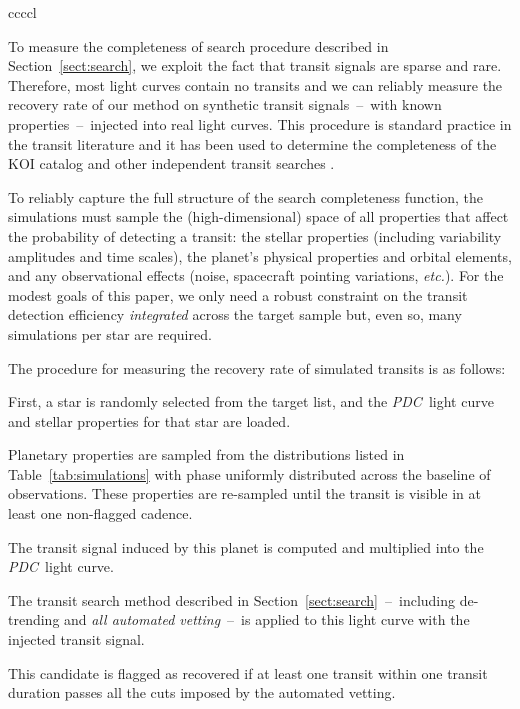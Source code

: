 \documentclass[manuscript, letterpaper]{aastex6}
\makeatletter
\let\origsection\section
\renewcommand\section{\@ifstar{\starsection}{\nostarsection}}
\newcommand\nostarsection[1]{\sectionprelude\origsection{#1}}
\newcommand\starsection[1]{\sectionprelude\origsection*{#1}}
\newcommand\sectionprelude{\vspace{1em}}
\newcommand{\project}[1]{\textsl{#1}}
\newcommand{\pdc}{\project{PDC}}
\newcommand{\foreign}[1]{\emph{#1}}
\newcommand{\etc}{\foreign{etc.}}
\newcommand{\sectionname}{Section}
\newcommand{\sectref}[1]{\ref{sect:#1}}
\newcommand{\Sect}[1]{\sectionname~\sectref{#1}}
\newcommand{\sect}[1]{\Sect{#1}}
\newcommand{\sectlabel}[1]{\label{sect:#1}}
\makeatother
\begin{document}
\begin{floattable}
\begin{deluxetable}{ccccl}
\tabletypesize{\footnotesize}
\caption{The signals rejected with a centroid shift or large impact parameter
\label{tab:rejects}}

\end{deluxetable}
\end{floattable}


\section{Empirical search completeness}\sectlabel{completeness}

To measure the completeness of search procedure described in \sect{search}, we
exploit the fact that transit signals are sparse and rare.
Therefore, most light curves contain no transits and we can reliably measure
the recovery rate of our method on synthetic transit signals~--~with known
properties~--~injected into real light curves.
This procedure is standard practice in the transit literature and it has been
used to determine the completeness of the KOI catalog
\citep{Christiansen:2013, Christiansen:2015} and other independent transit
searches \citep{Petigura:2013, Dressing:2015, Foreman-Mackey:2015}.

To reliably capture the full structure of the search completeness function,
the simulations must sample the (high-dimensional) space of all properties
that affect the probability of detecting a transit: the stellar properties
(including variability amplitudes and time scales), the planet's physical
properties and orbital elements, and any observational effects (noise,
spacecraft pointing variations, \etc).
For the modest goals of this paper, we only need a robust constraint on the
transit detection efficiency \emph{integrated} across the target sample but,
even so, many simulations per star are required.

The procedure for measuring the recovery rate of simulated transits is as
follows:
\begin{enumerate}
{\item First, a star is randomly selected from the target list, and the \pdc\
light curve and stellar properties for that star are loaded.}
{\item Planetary properties are sampled from the distributions listed in
Table~\ref{tab:simulations} with phase uniformly distributed across the
baseline of observations. These properties are re-sampled until the transit is
visible in at least one non-flagged cadence.}
{\item The transit signal induced by this planet is computed and multiplied
into the \pdc\ light curve.}
{\item The transit search method described in \sect{search}~--~including
de-trending and \emph{all automated vetting}~--~is applied to this light
curve with the injected transit signal.}
{\item This candidate is flagged as recovered if at least one transit within
one transit duration passes all the cuts imposed by the automated vetting.}
\end{enumerate}
\end{document}
